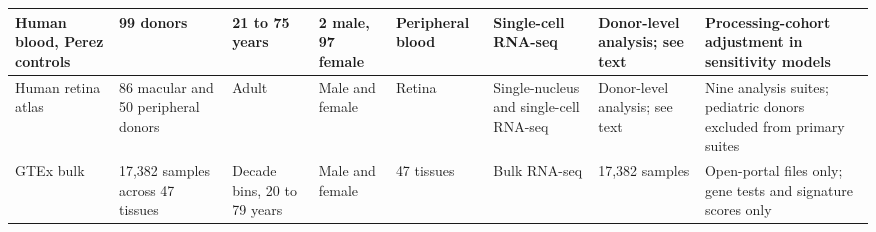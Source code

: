 \documentclass[11pt]{article}
\begin{document}
{\begin{longtable}{p{}p{}p{}p{}p{}p{}p{}p{}}
Human blood, Perez controls & 99 donors & 21 to 75 years & 2 male, 97 female & Peripheral blood & Single-cell RNA-seq & Donor-level analysis; see text & Processing-cohort adjustment in sensitivity models \\ \hline
Human retina atlas & 86 macular and 50 peripheral donors & Adult & Male and female & Retina & Single-nucleus and single-cell RNA-seq & Donor-level analysis; see text & Nine analysis suites; pediatric donors excluded from primary suites \\ \hline
GTEx bulk & 17,382 samples across 47 tissues & Decade bins, 20 to 79 years & Male and female & 47 tissues & Bulk RNA-seq & 17,382 samples & Open-portal files only; gene tests and signature scores only \\ \hline
\end{longtable}}
\end{document}

